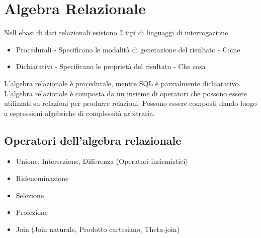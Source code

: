 \chapter{Algebra Relazionale}
Nell ebasi di dati relazionali esistono 2 tipi di linguaggi di interrogazione
\begin{itemize}
    \item Procedurali - Specificano le modalità di generazione del risultato - Come
    \item Dichiarativi - Specificano le proprietà del risultato - Che cosa
\end{itemize}
L'algebra relazionale è procedurale, mentre SQL è parzialmente dichiarativo.\\
L'algebra relazionale è composta da un insieme di operatori che possono essere
utilizzati su relazioni per produrre relazioni. Possono essere composti dando
luogo a espressioni algebriche di complessità arbitraria.\\
\section{Operatori dell'algebra relazionale}
\begin{itemize}
    \item Unione, Intersezione, Differenza (Operatori insiemistici)
    \item Ridenominazione
    \item Selezione
    \item Proiezione
    \item Join (Join naturale, Prodotto cartesiano, Theta-join)
\end{itemize}
